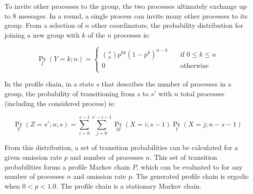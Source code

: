 To invite other processes to the group, the two processes ultimately exchange up to 8 messages.
In a round, a single process can invite many other processes to its group.
From a selection of $n$ other coordinators, the probability distribution for joining a new group with $k$ of the $n$ processes is:

\[
	\Pr_{I}(Y=k; n) =
	\begin{cases}
		\binom{n}{k} p^{8k}(1-p^8)^{n-k} & \quad \text{if } 0 \leq k \leq n \\
		0                                & \quad \text{otherwise} \\
	\end{cases}
\]

In the profile chain, in a state $s$ that describes the number of processes in a group, the probability of transitioning from $s$ to $s'$ with $n$ total processes (including the considered process) is:

\[ \Pr_{T}(Z=s'; n; s) = \sum_{i=0}^{s-1} \sum_{j=0}^{s'-i-1} \Pr_{M}(X=i; s-1) \Pr_{I}(X=j; n-s-1) \]

From this distribution, a set of transition probabilities can be calculated for a given omission rate $p$ and number of processes $n$.
This set of transition probabilities forms a profile Markov chain $P$, which can be evaluated to for any number of processes $n$ and omission rate $p$.
The generated profile chain is ergodic when $0<p<1.0$. The profile chain is a stationary Markov chain.


